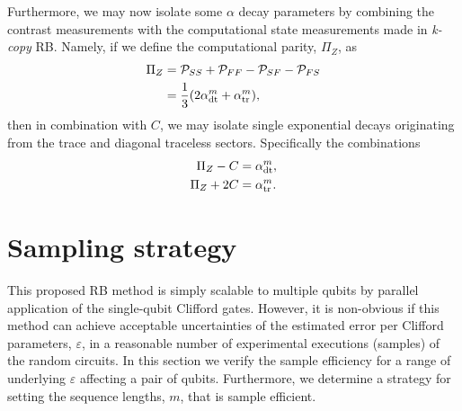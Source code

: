 Furthermore, we may now isolate some $\alpha$ decay parameters by 
combining the contrast measurements with the computational state measurements made in \emph{k-copy} RB. Namely, if we define the computational parity, $\Pi_Z$, as
\begin{equation}
\begin{split}
    \Pi_Z &= \mathcal{P}_{SS}+\mathcal{P}_{FF}-\mathcal{P}_{SF}-\mathcal{P}_{FS}\\
    &=\frac{1}{3}(2\alpha_{\rm dt}^m+\alpha_{\rm tr}^m),
\end{split}
\end{equation}
then in combination with $C$, we may isolate single exponential decays originating from the trace and diagonal traceless sectors.
Specifically the combinations
\begin{equation}
    \begin{split}
        \Pi_Z-C&=\alpha_{\rm dt}^m,\\
        \Pi_Z+2C&=\alpha_{\rm tr}^m.\\
    \end{split}
\end{equation}

\section{Sampling strategy}
\label{sec:fisher}

This proposed RB method is simply scalable to multiple qubits by parallel
application of the single-qubit Clifford gates. However, it is non-obvious if
this method can achieve acceptable uncertainties of the estimated error per
Clifford parameters, $\varepsilon$, in a reasonable number of experimental
executions (samples) of the random circuits. In this section we verify the
sample efficiency for a range of underlying $\varepsilon$ affecting a pair of
qubits. Furthermore, we determine a strategy for setting the sequence lengths,
$m$, that is sample efficient.\\

